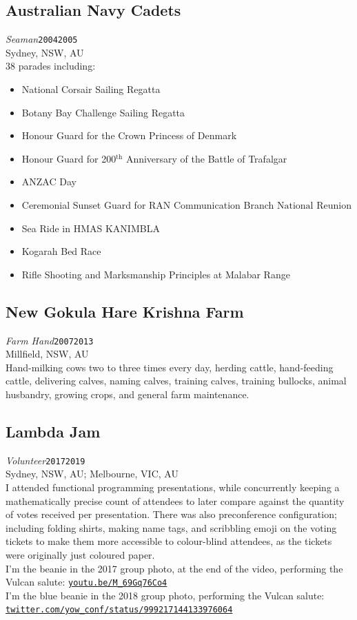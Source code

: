 \documentclass[12pt,a4paper,oneside]{article}
\newcommand{\xp}[6]{{\normalsize\textit{#1}\hfill\texttt{#5}\\\phantom{menace}\hfill#2, #3, #4}\\}
\newcommand{\textapprox}{\raisebox{0.5ex}{\texttildelow}}
\begin{document}
\subsection{Australian Navy Cadets}
\xp{Seaman}{Sydney}{NSW}{AU}{2004\textapprox{}2005}
\\38 parades including:
\begin{itemize}
	\item National Corsair Sailing Regatta
	\item Botany Bay Challenge Sailing Regatta
	\item Honour Guard for the Crown Princess of Denmark
	\item Honour Guard for 200$^\text{th}$ Anniversary of the Battle of Trafalgar
	\item ANZAC Day
	\item Ceremonial Sunset Guard for RAN Communication Branch $\text{National Reunion}$
	\item Sea Ride in HMAS KANIMBLA
	\item Kogarah Bed Race
	\item Rifle Shooting and Marksmanship Principles at Malabar Range
\end{itemize}
\subsection{New Gokula Hare Krishna Farm}
\xp{Farm Hand}{Millfield}{NSW}{AU}{2007\textapprox{}2013}
\\Hand-milking cows two to three times every day, herding cattle, hand-feeding cattle, delivering calves, naming calves, training calves, training bullocks, animal husbandry, growing crops, and general farm maintenance.
\subsection{Lambda Jam}
\normalsize\textit{Volunteer}\hfill\texttt{2017\textapprox{}2019}\\\phantom{menace}\hfill{}Sydney, NSW, AU; Melbourne, VIC, AU
\\I attended functional programming presentations, while concurrently keeping a mathematically precise count of attendees to later compare against the quantity of votes received per presentation. There was also preconference configuration; including folding shirts, making name tags, and scribbling emoji on the voting tickets to make them more accessible to colour-blind attendees, as the tickets were originally just coloured paper.
\\I'm the beanie in the 2017 group photo, at the end of the video, performing the Vulcan salute: \href{https://www.youtube.com/watch?v=M_69Gq76Co4}{\texttt{youtu.be/M\_69Gq76Co4}}%
\\I'm the blue beanie in the 2018 group photo, performing the Vulcan salute: \\\href{https://twitter.com/yow_conf/status/999217144133976064}{\texttt{twitter.com/yow\_conf/status/999217144133976064}}
\end{document}
